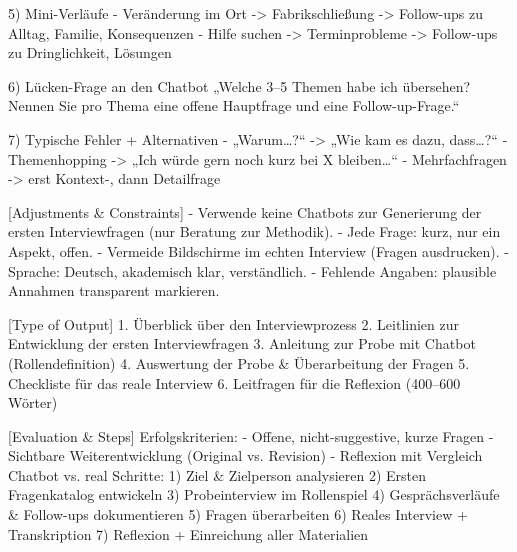 \documentclass[
  ngerman,
  letterpaper,
  DIV=11]{scrreprt}
\newenvironment{Shaded}{\begin{snugshade}}{\end{snugshade}}
\newcommand{\CommentTok}[1]{\textcolor[rgb]{0.37,0.37,0.37}{#1}}
\newcommand{\NormalTok}[1]{\textcolor[rgb]{0.00,0.23,0.31}{#1}}
\newcommand{\OtherTok}[1]{\textcolor[rgb]{0.00,0.23,0.31}{#1}}
\newcommand{\SpecialStringTok}[1]{\textcolor[rgb]{0.13,0.47,0.30}{#1}}
\begin{document}
\begin{tcolorbox}
\begin{Shaded}
\begin{Highlighting}[]
\NormalTok{5) Mini{-}Verläufe}
\SpecialStringTok{{-} }\NormalTok{Veränderung im Ort {-}\textgreater{} Fabrikschließung {-}\textgreater{} Follow{-}ups zu Alltag, Familie, Konsequenzen}
\SpecialStringTok{{-} }\NormalTok{Hilfe suchen {-}\textgreater{} Terminprobleme {-}\textgreater{} Follow{-}ups zu Dringlichkeit, Lösungen}

\NormalTok{6) Lücken{-}Frage an den Chatbot}
\NormalTok{„Welche 3–5 Themen habe ich übersehen? Nennen Sie pro Thema eine offene Hauptfrage und eine Follow{-}up{-}Frage.“}

\NormalTok{7) Typische Fehler + Alternativen}
\SpecialStringTok{{-} }\NormalTok{„Warum…?“ {-}\textgreater{} „Wie kam es dazu, dass…?“}
\SpecialStringTok{{-} }\NormalTok{Themenhopping {-}\textgreater{} „Ich würde gern noch kurz bei X bleiben…“}
\SpecialStringTok{{-} }\NormalTok{Mehrfachfragen {-}\textgreater{} erst Kontext{-}, dann Detailfrage}

\CommentTok{[}\OtherTok{Adjustments \& Constraints}\CommentTok{]}
\SpecialStringTok{{-} }\NormalTok{Verwende keine Chatbots zur Generierung der ersten Interviewfragen (nur Beratung zur Methodik).}
\SpecialStringTok{{-} }\NormalTok{Jede Frage: kurz, nur ein Aspekt, offen.}
\SpecialStringTok{{-} }\NormalTok{Vermeide Bildschirme im echten Interview (Fragen ausdrucken).}
\SpecialStringTok{{-} }\NormalTok{Sprache: Deutsch, akademisch klar, verständlich.}
\SpecialStringTok{{-} }\NormalTok{Fehlende Angaben: plausible Annahmen transparent markieren.}

\CommentTok{[}\OtherTok{Type of Output}\CommentTok{]}
\SpecialStringTok{1. }\NormalTok{Überblick über den Interviewprozess}
\SpecialStringTok{2. }\NormalTok{Leitlinien zur Entwicklung der ersten Interviewfragen}
\SpecialStringTok{3. }\NormalTok{Anleitung zur Probe mit Chatbot (Rollendefinition)}
\SpecialStringTok{4. }\NormalTok{Auswertung der Probe \& Überarbeitung der Fragen}
\SpecialStringTok{5. }\NormalTok{Checkliste für das reale Interview}
\SpecialStringTok{6. }\NormalTok{Leitfragen für die Reflexion (400–600 Wörter)}

\CommentTok{[}\OtherTok{Evaluation \& Steps}\CommentTok{]}
\NormalTok{Erfolgskriterien:}
\SpecialStringTok{{-} }\NormalTok{Offene, nicht{-}suggestive, kurze Fragen}
\SpecialStringTok{{-} }\NormalTok{Sichtbare Weiterentwicklung (Original vs. Revision)}
\SpecialStringTok{{-} }\NormalTok{Reflexion mit Vergleich Chatbot vs. real}
\NormalTok{Schritte:}
\NormalTok{1) Ziel \& Zielperson analysieren}
\NormalTok{2) Ersten Fragenkatalog entwickeln}
\NormalTok{3) Probeinterview im Rollenspiel}
\NormalTok{4) Gesprächsverläufe \& Follow{-}ups dokumentieren}
\NormalTok{5) Fragen überarbeiten}
\NormalTok{6) Reales Interview + Transkription}
\NormalTok{7) Reflexion + Einreichung aller Materialien}

\end{Highlighting}
\end{Shaded}

\end{tcolorbox}
\end{document}
